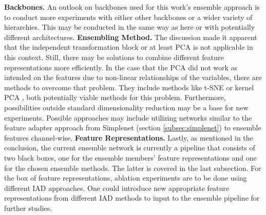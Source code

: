 \textbf{Backbones.} An outlook on backbones used for this work's ensemble approach is to conduct more experiments with either other backbones or a wider variety of hierarchies. 
This may be conducted in the same way as here or with potentially different architectures.
\newline\newline
\textbf{Ensembling Method.} The discussion made it apparent that the independent transformation block \cite{EnsembleHeller2023} or at least PCA is not applicable in this context. 
Still, there may be solutions to combine different feature representations more efficiently. In the case that the PCA did not work as intended on the features due to non-linear 
relationships of the variables, there are methods to overcome that problem. They include methods like t-SNE\cite{tSNE} or kernel PCA \cite{Hoffmann_2007kernelPCA}, both potentially 
viable methods for this problem. Furthermore, possibilities outside standard dimensionality reduction may be a base for new experiments. Possible approaches may include 
utilizing networks similar to the feature adapter approach from Simplenet (section \ref{subsec:simplenet}) to ensemble features channel-wise.
\newline\newline
\textbf{Feature Representations.} Lastly, as mentioned in the conclusion, the current ensemble network is currently a pipeline that consists of two black boxes, one for the ensemble 
members' feature representations and one for the chosen ensemble methods. The latter is covered in the last subsection. For the box of feature representations, ablation experiments are to be done using different IAD approaches. One could introduce new appropriate feature representations from different IAD methods to input to the ensemble pipeline for 
further studies.
